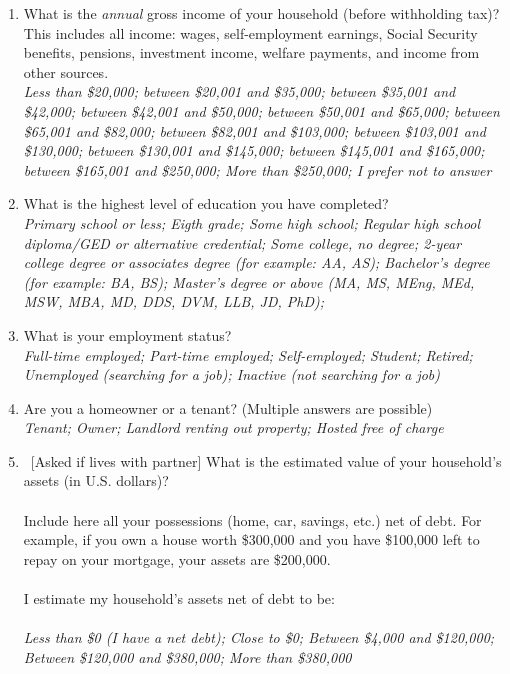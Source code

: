 \begin{enumerate}[resume]
\item What is the \textit{annual} gross income of your household (before withholding tax)? This includes all income: wages, self-employment earnings, Social Security benefits, pensions, investment income, welfare payments, and income from other sources. %
\\ \textit{Less than \$20,000; between \$20,001 and \$35,000; between \$35,001 and \$42,000; between \$42,001 and \$50,000; between \$50,001 and \$65,000; between \$65,001 and \$82,000; between \$82,001 and \$103,000; between \$103,001 and \$130,000; between \$130,001 and \$145,000; between \$145,001 and \$165,000; between \$165,001 and \$250,000; More than \$250,000; I prefer not to answer}
\item What is the highest level of education you have completed? 
\\ \textit{Primary school or less; Eigth grade; Some high school; Regular high school diploma/GED or alternative credential; Some college, no degree; 2-year college degree or associates degree (for example: AA, AS); Bachelor's degree (for example: BA, BS); Master’s degree or above (MA, MS, MEng, MEd, MSW, MBA, MD, DDS, DVM, LLB, JD, PhD); }
\item What is your employment status? \label{item:employment}
\\ \textit{Full-time employed; Part-time employed; Self-employed; Student; Retired; Unemployed (searching for a job); Inactive (not searching for a job)}
\item Are you a homeowner or a tenant? (Multiple answers are possible) 
\\ \textit{Tenant; Owner; Landlord renting out property; Hosted free of charge}
\item ~[Asked if lives with partner] What is the estimated value of your household's assets (in U.S. dollars)?  \\
   \\
Include here all your possessions (home, car, savings, etc.) net of debt. For example, if you own a house worth \$300,000 and you have \$100,000 left to repay on your mortgage, your assets are \$200,000.  \\
  \\
I estimate my household's assets net of debt to be:  \\%
\\  \textit{Less than \$0 (I have a net debt); Close to \$0; Between \$4,000 and \$120,000; Between \$120,000 and \$380,000; More than \$380,000}

\end{enumerate}
